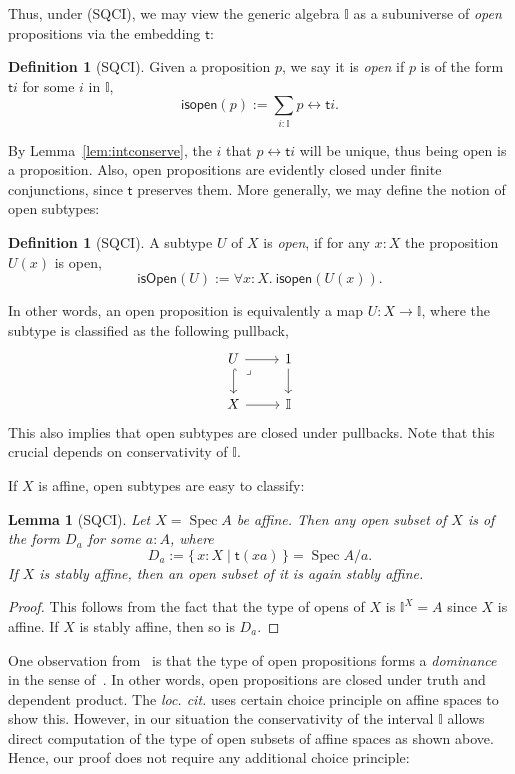 \documentclass[12pt]{amsart}
\newtheorem{lemma}[theorem]{Lemma}
\theoremstyle{definition}
\newtheorem{definition}[theorem]{Definition}
\newcommand{\mbb}[1]{\mathbb{#1}}
\newcommand{\I}{\mbb I}
\newcommand{\ms}[1]{\mathsf{#1}}
\newcommand{\scomp}[2]{\{\,#1\mid#2\,\}}
\newcommand{\fa}[2]{\forall #1\!\colon\!\!#2.\ }
\newcommand{\eq}{\leftrightarrow}
\newcommand{\spec}{\operatorname{Spec}}
\begin{document}
Thus, under (SQCI), we may view the generic algebra $\I$ as a subuniverse of \emph{open} propositions via the embedding $\ms t$:

\begin{definition}[SQCI]
  Given a proposition $p$, we say it is \emph{open} if $p$ is of the form $\ms ti$ for some $i$ in $\I$,
  \[ \ms{isopen}(p) := \sum_{i:\I}p \eq \ms ti. \]
\end{definition}

By Lemma~\ref{lem:intconserve}, the $i$ that $p \eq \ms ti$ will be unique, thus being open is a proposition. Also, open propositions are evidently closed under finite conjunctions, since $\ms t$ preserves them. More generally, we may define the notion of open subtypes:

\begin{definition}[SQCI]
  A subtype $U$ of $X$ is \emph{open}, if for any $x:X$ the proposition $U(x)$ is open,
  \[ \ms{isOpen}(U) := \fa xX \ms{isopen}(U(x)). \]
\end{definition}

In other words, an open proposition is equivalently a map $U : X \to \I$, where the subtype is classified as the following pullback,
\[
\begin{tikzcd}
  U \ar[d, hook] \ar[r] & 1 \ar[d] \\ 
  X \ar[r] & \I
  \arrow["\lrcorner"{anchor=center, pos=0.125}, draw=none, from=1-1, to=2-2]
\end{tikzcd}
\]
This also implies that open subtypes are closed under pullbacks. Note that this crucial depends on conservativity of $\I$. 

If $X$ is affine, open subtypes are easy to classify:

\begin{lemma}[SQCI]\label{lem:openofaffinegivesalgebra}
  Let $X = \spec A$ be affine. Then any open subset of $X$ is of the form $D_a$ for some $a:A$, where
  \[ D_a := \scomp{x : X}{\ms t(xa)} = \spec A/a. \]
  If $X$ is stably affine, then an open subset of it is again stably affine.
\end{lemma}
\begin{proof}
  This follows from the fact that the type of opens of $X$ is $\I^X = A$ since $X$ is affine. If $X$ is stably affine, then so is $D_a$.
\end{proof}

One observation from~\cite{Cherubini_Coquand_Hutzler_2024} is that the type of open propositions forms a \emph{dominance} in the sense of~\cite{rosolini1986continuity}. In other words, open propositions are closed under truth and dependent product. The \emph{loc. cit.} uses certain choice principle on affine spaces to show this. However, in our situation the conservativity of the interval $\I$ allows direct computation of the type of open subsets of affine spaces as shown above. Hence, our proof does not require any additional choice principle:
\end{document}
